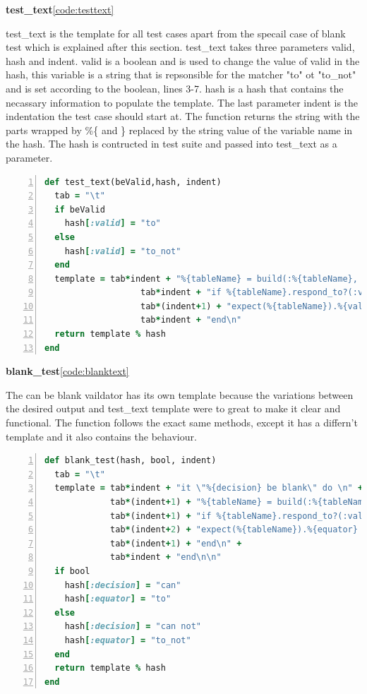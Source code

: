 \documentclass[a4paper,12pt]{article}
\begin{document}
\par \textbf{test\_text}\ref{code:testtext}
\par test\_text is the template for all test cases apart from the specail case of blank test which is explained after this section. test\_text takes three parameters valid, hash and indent. valid is a boolean and is used to change the value of valid in the hash, this variable is a string that is repsonsible for the matcher "to" ot "to\_not" and is set according to the boolean, lines 3-7. hash is a hash that contains the necassary information to populate the template. The last parameter indent is the indentation the test case should start at. The function returns the string with the parts wrapped by \%\{ and \} replaced by the string value of the variable name in the hash. The hash is contructed in test suite and passed into test\_text as a parameter.
\begin{landscape}
\begin{lstlisting}[frame=single,numbers=left,language = ruby,caption= {test\_text}, label={code:testtext}]
def test_text(beValid,hash, indent)
  tab = "\t"
  if beValid
    hash[:valid] = "to"
  else
    hash[:valid] = "to_not"
  end
  template = tab*indent + "%{tableName} = build(:%{tableName}, %{fieldName}: %{generatedValue})\n" +
                   tab*indent + "if %{tableName}.respond_to?(:valid?)\n" +
                   tab*(indent+1) + "expect(%{tableName}).%{valid} be_valid, lambda {%{tableName}.errors.full_messages.join(\"\\n\")}\n" +
                   tab*indent + "end\n" 
  return template % hash
end
\end{lstlisting}
\end{landscape}

\par \textbf{blank\_test}\ref{code:blanktext}
\par The can be blank vaildator has its own template because the variations between the desired output and test\_text template were to great to make it clear and functional. The function follows the exact same methods, except it has a differn't template and it also contains the behaviour. 
\begin{landscape}
\begin{lstlisting}[frame=single,numbers=left,language = ruby,caption= {blank\_test}, label={code:blanktext}]
def blank_test(hash, bool, indent)
  tab = "\t" 
  template = tab*indent + "it \"%{decision} be blank\" do \n" +
             tab*(indent+1) + "%{tableName} = build(:%{tableName}, %{fieldName}: nil)\n" +
             tab*(indent+1) + "if %{tableName}.respond_to?(:valid?)\n" +
             tab*(indent+2) + "expect(%{tableName}).%{equator} be_valid, lambda {%{tableName}.errors.full_messages.join(\"\\n\")}\n" +
             tab*(indent+1) + "end\n" +
             tab*indent + "end\n\n"
  if bool
    hash[:decision] = "can"
    hash[:equator] = "to"
  else
    hash[:decision] = "can not"
    hash[:equator] = "to_not"
  end    
  return template % hash
end
\end{lstlisting}
\end{landscape}
\end{document}

